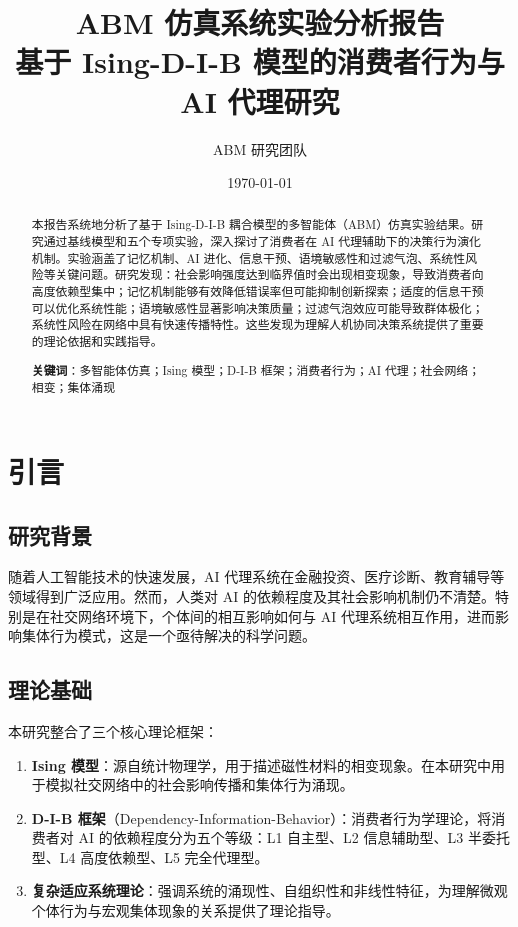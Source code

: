 \documentclass[a4paper,12pt]{article}
\title{\textbf{\huge ABM 仿真系统实验分析报告}\\[0.5cm]
\Large 基于 Ising-D-I-B 模型的消费者行为与 AI 代理研究}
\author{ABM 研究团队}
\date{\today}
\begin{document}
\maketitle

\begin{abstract}
\noindent 本报告系统地分析了基于 Ising-D-I-B 耦合模型的多智能体（ABM）仿真实验结果。研究通过基线模型和五个专项实验，深入探讨了消费者在 AI 代理辅助下的决策行为演化机制。实验涵盖了记忆机制、AI 进化、信息干预、语境敏感性和过滤气泡、系统性风险等关键问题。研究发现：社会影响强度达到临界值时会出现相变现象，导致消费者向高度依赖型集中；记忆机制能够有效降低错误率但可能抑制创新探索；适度的信息干预可以优化系统性能；语境敏感性显著影响决策质量；过滤气泡效应可能导致群体极化；系统性风险在网络中具有快速传播特性。这些发现为理解人机协同决策系统提供了重要的理论依据和实践指导。

\vspace{1cm}
\noindent \textbf{关键词}：多智能体仿真；Ising 模型；D-I-B 框架；消费者行为；AI 代理；社会网络；相变；集体涌现
\end{abstract}

\tableofcontents
\newpage

\section{引言}

\subsection{研究背景}

随着人工智能技术的快速发展，AI 代理系统在金融投资、医疗诊断、教育辅导等领域得到广泛应用。然而，人类对 AI 的依赖程度及其社会影响机制仍不清楚。特别是在社交网络环境下，个体间的相互影响如何与 AI 代理系统相互作用，进而影响集体行为模式，这是一个亟待解决的科学问题。

\subsection{理论基础}

本研究整合了三个核心理论框架：

\begin{enumerate}
    \item \textbf{Ising 模型}：源自统计物理学，用于描述磁性材料的相变现象。在本研究中用于模拟社交网络中的社会影响传播和集体行为涌现。
    
    \item \textbf{D-I-B 框架}（Dependency-Information-Behavior）：消费者行为学理论，将消费者对 AI 的依赖程度分为五个等级：L1 自主型、L2 信息辅助型、L3 半委托型、L4 高度依赖型、L5 完全代理型。
    
    \item \textbf{复杂适应系统理论}：强调系统的涌现性、自组织性和非线性特征，为理解微观个体行为与宏观集体现象的关系提供了理论指导。
\end{enumerate}
\end{document}
